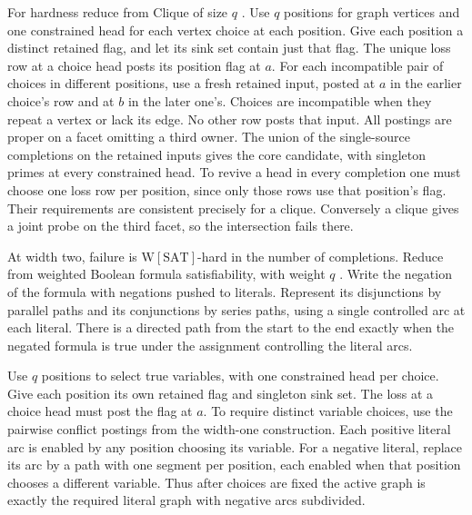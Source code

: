 For hardness reduce from Clique of size $q$
\cite[Corollary~3.2]{DowneyFellows1995Clique}.
Use $q$ positions for graph vertices and one
constrained head for each vertex choice at each
position. Give each position a distinct retained
flag, and let its sink set contain just that flag.
The unique loss row at a choice head posts its
position flag at $a$. For each incompatible pair
of choices in different positions, use a fresh
retained input, posted at $a$ in the earlier
choice's row and at $b$ in the later one's.
Choices are incompatible when they repeat a
vertex or lack its edge. No other row posts
that input. All postings are proper on a facet
omitting a third owner. The union of the
single-source completions on the retained
inputs gives the core candidate, with singleton
primes at every constrained head. To revive a
head in every completion one must choose one
loss row per position, since only those rows
use that position's flag. Their requirements
are consistent precisely for a clique. Conversely
a clique gives a joint probe on the third
facet, so the intersection fails there.

At width two, failure is $\mathrm{W[SAT]}$-hard in
the number of completions. Reduce from weighted Boolean
formula satisfiability, with weight $q$
\cite{DowneyFellowsRegan1998Circuit}.
Write the negation of the formula with negations
pushed to literals. Represent its disjunctions by
parallel paths and its conjunctions by series paths,
using a single controlled arc at each literal.
There is a directed path from the start to the end
exactly when the negated formula is true under
the assignment controlling the literal arcs.

Use $q$ positions to select true variables, with
one constrained head per choice. Give each position
its own retained flag and singleton sink set. The
loss at a choice head must post the flag at $a$.
To require distinct variable choices, use the
pairwise conflict postings from the width-one
construction. Each positive literal arc is enabled
by any position choosing its variable. For a negative
literal, replace its arc by a path with one segment
per position, each enabled when that position chooses
a different variable. Thus after choices are fixed
the active graph is exactly the required literal
graph with negative arcs subdivided.

